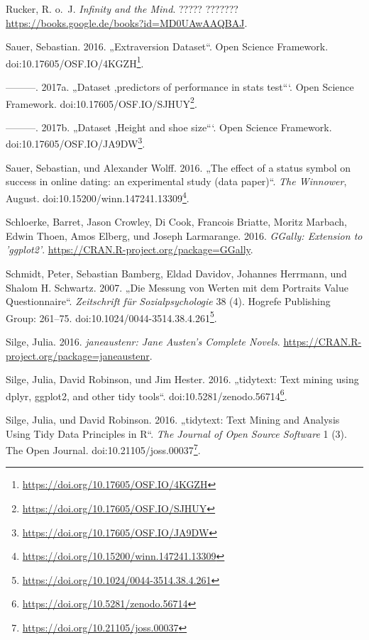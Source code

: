 \documentclass[12pt,ngerman,]{book}
\let\rmarkdownfootnote\footnote%
\def\footnote{\protect\rmarkdownfootnote}
\renewcommand{\href}[2]{#2\footnote{\url{#1}}}
\begin{document}
\hypertarget{ref-ruckerinfinity}{}
Rucker, R. o.~J. \emph{Infinity and the Mind}. ????? ???????
\url{https://books.google.de/books?id=MD0UAwAAQBAJ}.

\hypertarget{ref-Sauer_2016}{}
Sauer, Sebastian. 2016. „Extraversion Dataset``. Open Science Framework.
doi:\href{https://doi.org/10.17605/OSF.IO/4KGZH}{10.17605/OSF.IO/4KGZH}.

\hypertarget{ref-Sauer_2017}{}
---------. 2017a. „Dataset ‚predictors of performance in stats test```.
Open Science Framework.
doi:\href{https://doi.org/10.17605/OSF.IO/SJHUY}{10.17605/OSF.IO/SJHUY}.

\hypertarget{ref-Sauer_2017a}{}
---------. 2017b. „Dataset ‚Height and shoe size```. Open Science
Framework.
doi:\href{https://doi.org/10.17605/OSF.IO/JA9DW}{10.17605/OSF.IO/JA9DW}.

\hypertarget{ref-sauer_wolff}{}
Sauer, Sebastian, und Alexander Wolff. 2016. „The effect of a status
symbol on success in online dating: an experimental study (data
paper)``. \emph{The Winnower}, August.
doi:\href{https://doi.org/10.15200/winn.147241.13309}{10.15200/winn.147241.13309}.

\hypertarget{ref-R-GGally}{}
Schloerke, Barret, Jason Crowley, Di Cook, Francois Briatte, Moritz
Marbach, Edwin Thoen, Amos Elberg, und Joseph Larmarange. 2016.
\emph{GGally: Extension to 'ggplot2'}.
\url{https://CRAN.R-project.org/package=GGally}.

\hypertarget{ref-Schmidt2007}{}
Schmidt, Peter, Sebastian Bamberg, Eldad Davidov, Johannes Herrmann, und
Shalom H. Schwartz. 2007. „Die Messung von Werten mit dem Portraits
Value Questionnaire``. \emph{Zeitschrift für Sozialpsychologie} 38 (4).
Hogrefe Publishing Group: 261--75.
doi:\href{https://doi.org/10.1024/0044-3514.38.4.261}{10.1024/0044-3514.38.4.261}.

\hypertarget{ref-R-janeaustenr}{}
Silge, Julia. 2016. \emph{janeaustenr: Jane Austen's Complete Novels}.
\url{https://CRAN.R-project.org/package=janeaustenr}.

\hypertarget{ref-tidytext-archive}{}
Silge, Julia, David Robinson, und Jim Hester. 2016. „tidytext: Text
mining using dplyr, ggplot2, and other tidy tools``.
doi:\href{https://doi.org/10.5281/zenodo.56714}{10.5281/zenodo.56714}.

\hypertarget{ref-Silge2016}{}
Silge, Julia, und David Robinson. 2016. „tidytext: Text Mining and
Analysis Using Tidy Data Principles in R``. \emph{The Journal of Open
Source Software} 1 (3). The Open Journal.
doi:\href{https://doi.org/10.21105/joss.00037}{10.21105/joss.00037}.
\end{document}
